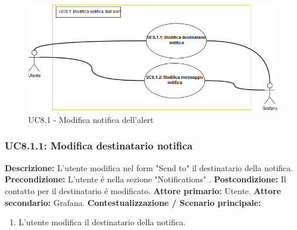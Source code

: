                          \begin{figure}[!htbp]
                    	\centering
                    	\includegraphics[width=\textwidth]{UC8-1.png}
                    	\caption{UC8.1 - Modifica notifica dell'alert}
                    	\label{uc8.1}
                    \end{figure}
                        
                \subsubsection{UC8.1.1: Modifica destinatario notifica }
                    \textbf{Descrizione:} L’utente modifica nel form "Send to" il destinatario della notifica.
                    \newline
                    \textbf{Precondizione:} L'utente é nella sezione "Notifications" .
                    \newline
                    \textbf{Postcondizione:} Il contatto per il destinatario é modificato.
                    \newline
                    \textbf{Attore primario:} Utente.
                    \newline
                    \textbf{Attore secondario:} Grafana.
                    \newline
                    \textbf{Contestualizzazione / Scenario principale:} \begin{enumerate}
                            \item L'utente modifica il destinatario della notifica.
                        \end{enumerate}        
                
                
